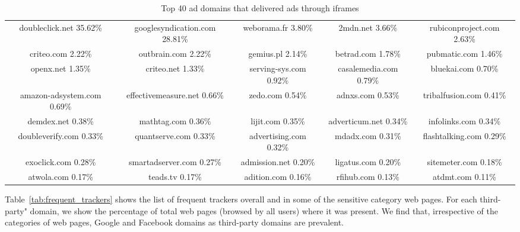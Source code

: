 \documentclass[conference]{IEEEtran}
\begin{document}
\begin{table*}[tb!]
\centering
\caption{Top 40 ad domains that delivered ads through iframes}
\label{tab:top_ad_domains}
\footnotesize
  \begin{tabular}{ccccc}
    \toprule
        
        doubleclick.net 35.62\% & googlesyndication.com 28.81\% & weborama.fr 3.80\% & 2mdn.net 3.66\% & rubiconproject.com 2.63\% \\
        criteo.com 2.22\% & outbrain.com 2.22\% & gemius.pl 2.14\% & betrad.com 1.78\% & pubmatic.com 1.46\% \\
        openx.net 1.35\% & criteo.net 1.33\% & serving-sys.com 0.92\% & casalemedia.com 0.79\% & bluekai.com 0.70\% \\
        amazon-adsystem.com 0.69\% & effectivemeasure.net 0.66\% & zedo.com 0.54\% & adnxs.com 0.53\% & tribalfusion.com 0.41\% \\
        demdex.net 0.38\% & mathtag.com 0.36\% & lijit.com 0.35\% & adverticum.net 0.34\% & infolinks.com 0.34\% \\ 
        doubleverify.com 0.33\% & quantserve.com 0.33\% & advertising.com 0.32\% & mdadx.com 0.31\% &  flashtalking.com 0.29\% \\ 
        exoclick.com 0.28\% & smartadserver.com 0.27\% & admission.net 0.20\% & ligatus.com 0.20\% & sitemeter.com 0.18\% \\ 
        atwola.com 0.17\% & teads.tv 0.17\% & adition.com 0.16\% & rfihub.com 0.13\% & atdmt.com 0.11\% \\ 
 
    \bottomrule
  \end{tabular}
\end{table*}




Table~\ref{tab:frequent_trackers} shows the list of frequent trackers overall and in some of the sensitive category web pages.
For each third-party" domain, we show the percentage of total web pages (browsed by all users) where it was present.
We find that, irrespective of the categories of web pages, Google and Facebook domains as third-party domains are prevalent.
\end{document}
